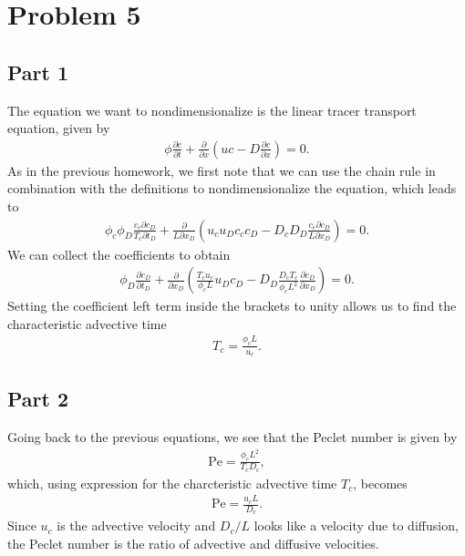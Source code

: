 \documentclass{article}
\begin{document}
\section{Problem 5}
\subsection{Part 1}
The equation we want to nondimensionalize is the linear tracer transport equation, given by
\begin{align}
    \phi \frac{\partial c}{\partial t} + \frac{\partial}{\partial x} \left(uc - D \frac{\partial c}{\partial x} \right) = 0.
\end{align}
As in the previous homework, we first note that we can use the chain rule in combination with the definitions to nondimensionalize the equation, which leads to
\begin{align}
    \phi_c \phi_D \frac{c_c \partial c_D}{T_c \partial t_D} + \frac{\partial}{L \partial x_D} \left(u_c u_D c_c c_D - D_c D_D \frac{c_c \partial c_D}{L \partial x_D} \right) = 0.
\end{align}
We can collect the coefficients to obtain
\begin{align}
    \phi_D \frac{\partial c_D}{\partial t_D} + \frac{\partial}{\partial x_D} \left(\frac{T_c u_c}{\phi_c L} u_D c_D - D_D \frac{D_c T_c}{\phi_c L^2} \frac{\partial c_D}{\partial x_D} \right) = 0.
\end{align}
Setting the coefficient left term inside the brackets to unity allows us to find the characteristic advective time
\begin{align}
    T_c = \frac{\phi_c L}{u_c}.
\end{align}

\subsection{Part 2}
Going back to the previous equations, we see that the Peclet number is given by
\begin{align}
    \mathrm{Pe} = \frac{\phi_c L^2}{T_c D_c},
\end{align}
which, using expression for the charcteristic advective time $T_c$, becomes
\begin{align}
    \mathrm{Pe} = \frac{u_c L}{D_c}.
\end{align}
Since $u_c$ is the advective velocity and $D_c / L$ looks like a velocity due to diffusion, the Peclet number is the ratio of advective and diffusive velocities.
\end{document}
